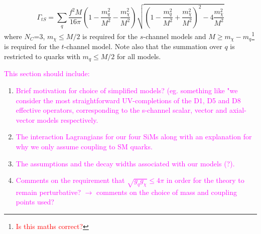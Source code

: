 \begin{flushleft}
\begin{equation}
\end{equation}
\begin{equation}
\label{gamma_tS}
\Gamma_{tS} = \sum_{\substack{q}} \frac{f^{2}M}{16\pi}\left(1 - \frac{m_{q}^{2}}{M^{2}} - \frac{m_{\chi}^{2}}{M^{2}}\right)\sqrt{\left(1 - \frac{m_{q}^{2}}{M^{2}} + \frac{m_{\chi}^{2}}{M^{2}}\right)^{2} - 4\frac{m_{\chi}^{2}}{M^{2}}}
\end{equation}
where $N_{C}$=3, $m_{\chi} \leq M/2$ is required for the $s$-channel models and $M \geq m_{\chi} - m_{q}$\footnote{\textcolor{red}{Is this maths correct?}} is required for the $t$-channel model. Note also that the summation over $q$ is restricted to quarks with $m_{q} \leq M/2$ for all models.
\bigskip

\textcolor{magenta}{This section should include:}
\begin{enumerate}
\item \textcolor{magenta}{Brief motivation for choice of simplified models? (eg. something like "we consider the most straightforward UV-completions of the D1, D5 and D8 effective operators, corresponding to the s-channel scalar, vector and axial-vector models respectively.}
\item \textcolor{magenta}{The interaction Lagrangians for our four SiMs along with an explanation for why we only assume coupling to SM quarks.}
\item \textcolor{magenta}{The assumptions and the decay widths associated with our models (?).}
\item \textcolor{magenta}{Comments on the requirement that $\sqrt{g_{q}g_{\chi}} \leq 4\pi$ in order for the theory to remain perturbative? $\rightarrow$ comments on the choice of mass and coupling points used?}
\end{enumerate}
\end{flushleft}


